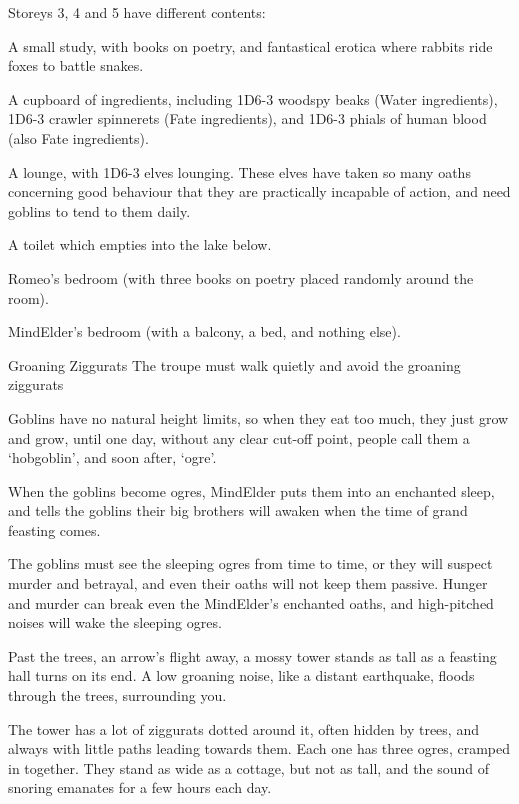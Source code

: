 Storeys 3, 4 and 5 have different contents:

\begin{dlist}
  \item
  A small study, with books on poetry, and fantastical erotica where rabbits ride foxes to battle snakes.
  \item
  A cupboard of \glspl{ingredient}, including 1D6-3 woodspy beaks (Water \glspl{ingredient}), 1D6-3 \gls{crawler} spinnerets (Fate \glspl{ingredient}), and 1D6-3 phials of human blood (also Fate \glspl{ingredient}).
  \item
  A lounge, with 1D6-3 elves lounging.  These elves have taken so many oaths concerning good behaviour that they are practically incapable of action, and need goblins to tend to them daily.
  \item
  A toilet which empties into the lake below.
  \item
  Romeo's bedroom (with three books on poetry placed randomly around the room).
  \item
  \gls{MindElder}'s bedroom (with a balcony, a bed, and nothing else).
\end{dlist}


{Groaning Ziggurats}%
{The troupe must walk quietly and avoid the groaning ziggurats}%

Goblins have no natural height limits, so when they eat too much, they just grow and grow, until one day, without any clear cut-off point, people call them a `hobgoblin', and soon after, `\gls{ogre}'.

When the goblins become \glspl{ogre}, \gls{MindElder} puts them into an enchanted sleep, and tells the goblins their big brothers will awaken when the time of grand feasting comes.

The goblins must see the sleeping \glspl{ogre} from time to time, or they will suspect murder and betrayal, and even their oaths will not keep them passive.
Hunger and murder can break even the \gls{MindElder}'s enchanted oaths, and high-pitched noises will wake the sleeping \glspl{ogre}.

\begin{boxtext}
  Past the trees, an arrow's flight away, a mossy tower stands as tall as a feasting hall turns on its end.
  A low groaning noise, like a distant earthquake, floods through the trees, surrounding you.
\end{boxtext}

The tower has a lot of ziggurats dotted around it, often hidden by trees, and always with little paths leading towards them.
Each one has three ogres, cramped in together.
They stand as wide as a cottage, but not as tall, and the sound of snoring emanates for a few hours each day.

